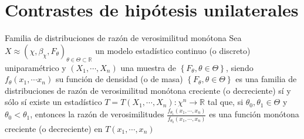 \section*{Contrastes de hipótesis unilaterales}
Familia de distribuciones de razón de verosimilitud monótona Sea $X \approx\left(\chi, \beta_{\chi}, F_{\theta}\right)_{\theta \in \Theta \subset \mathbb{R}}$ un modelo estadístico continuo (o discreto) uniparamétrico y $\left(X_{1}, \cdots, X_{n}\right)$ una muestra de $\left\{F_{\theta}, \theta \in \Theta\right\}$, siendo $f_{\theta}\left(x_{1}, \cdots x_{n}\right)$ su función de densidad (o de masa) $\left\{F_{\theta}, \theta \in \Theta\right\}$ es una familia de distribuciones de razón de verosimilitud monótona creciente (o decreciente) sí y sólo sí existe un estadístico $T=T\left(X_{1}, \cdots, X_{n}\right): \chi^{n} \rightarrow \mathbb{R}$ tal que, si $\theta_{0}, \theta_{1} \in \Theta$ y $\theta_{0}<\theta_{1}$, entonces la razón de verosimilitudes $\frac{f_{\theta_{1}}\left(x_{1}, \cdots, x_{n}\right)}{f_{\theta_{0}}\left(x_{1}, \cdots, x_{n}\right)}$ es una función monótona creciente (o decreciente) en $T\left(x_{1}, \cdots, x_{n}\right)$